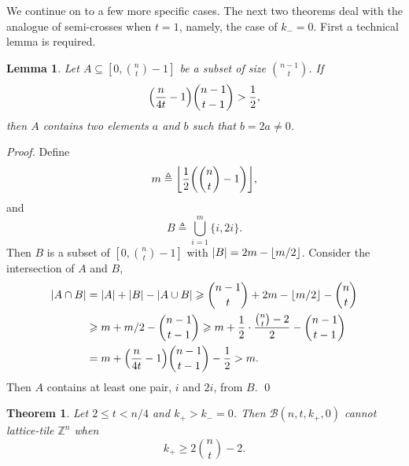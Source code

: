 \documentclass[sort&compress]{elsarticle}
\DeclarePairedDelimiter\abs{\lvert}{\rvert}
\DeclarePairedDelimiter\floor{\lfloor}{\rfloor}
\DeclarePairedDelimiter\parenv{\lparen}{\rparen}
\newcommand{\cB}{\mathcal{B}}
\renewcommand{\leq}{\leqslant}
\renewcommand{\geq}{\geqslant}
\newtheorem{theorem}{Theorem}
\newtheorem{lemma}{Lemma}
\newcommand{\Z}{\mathbb{Z}}
\newcommand{\kp}{k_+}
\newcommand{\km}{k_-}
\newcommand{\eqdef}{\triangleq}
\begin{document}
We continue on to a few more specific cases. The next two theorems
deal with the analogue of semi-crosses when $t=1$, namely, the case of
$\km=0$. First a technical lemma is required.

\begin{lemma}\label{lem-settwice}
Let $A\subseteq [0,\binom{n}{t}-1]$ be a subset of size $\binom{n-1}{t}$.  If 
\[\parenv*{\frac{n}{4t}-1}\binom{n-1}{t-1}> \frac{1}{2},\]
 then $A$ contains two elements $a$ and $b$ such that $b=2a\neq 0$.
\end{lemma}

\begin{proof}
Define \[m\eqdef  \floor*{\frac{1}{2}\parenv*{\binom{n}{t} -1}},\] and
\[B \eqdef \bigcup_{i=1}^{m}  \{i,2i\}.\] 
Then $B$ is a subset of $[0,\binom{n}{t}-1]$ with
$\abs{B}=2m-\floor{m/2}$. Consider the intersection of $A$ and $B$,
\begin{align*}
  \abs{A\cap B} &= \abs{A}+\abs{B} -\abs{A\cup B} \geq \binom{n-1}{t} + 2m-\lfloor m/2\rfloor - \binom{n}{t} \\
  &\geq m+ m/2 - \binom{n-1}{t-1}
  \geq m+ \frac{1}{2} \cdot\frac{ \binom{n}{t} -2}{2}- \binom{n-1}{t-1} \\
  &= m +  \parenv*{\frac{n}{4t}-1}\binom{n-1}{t-1} -\frac{1}{2} > m.
\end{align*}
Then $A$ contains at least one pair, $i$ and $2i$, from $B$. 
\qed\end{proof}

\begin{theorem}
Let $2\leq t < n/4$ and $\kp> \km=0$.  Then $\cB(n,t,\kp,0)$
cannot lattice-tile $\Z^n$ when
\[\kp\geq  2 \binom{n}{t}-2.\] 
\end{theorem}
\end{document}
